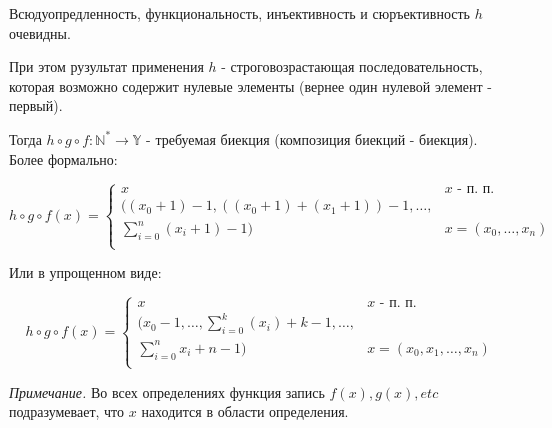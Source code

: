 \documentclass{article}
\newcommand{\N}{\mathbb{N}}
\newcommand{\Y}{\mathbb{Y}}
\begin{document}
    Всюдуопредленность, функциональность, инъективность и сюръективность $h$ очевидны.

    При этом рузультат применения $h$ - строговозрастающая последовательность, которая возможно содержит нулевые элементы (вернее один нулевой элемент - первый). 

    Тогда $h \circ g \circ f: \N^* \rightarrow \Y$ - требуемая биекция (композиция биекций - биекция). Более формально:

    \begin{equation*}
        h \circ g \circ f (x) = 
         \begin{cases}
           x &\text{$x$ - п. п.}\\
           ((x_0 + 1) - 1, ((x_0 + 1) + (x_1 + 1)) - 1, \ldots,\\ \sum_{i=0}^{n} (x_i + 1) - 1) &\text{$x = (x_0, \ldots, x_n)$}\\
         \end{cases}
    \end{equation*}

    Или в упрощенном виде:

    \begin{equation*}
        h \circ g \circ f (x) = 
         \begin{cases}
           x &\text{$x$ - п. п.}\\
           (x_0 - 1,  \ldots, \sum_{i=0}^{k} (x_i) + k - 1, \ldots,\\ \sum_{i=0}^{n} x_i + n - 1) &\text{$x = (x_0, x_1, \ldots, x_n)$}\\
         \end{cases}
    \end{equation*}

    \textit{Примечание.} Во всех определениях функция запись $f(x), g(x), etc$ подразумевает, что $x$ находится в области определения.
\end{document}
